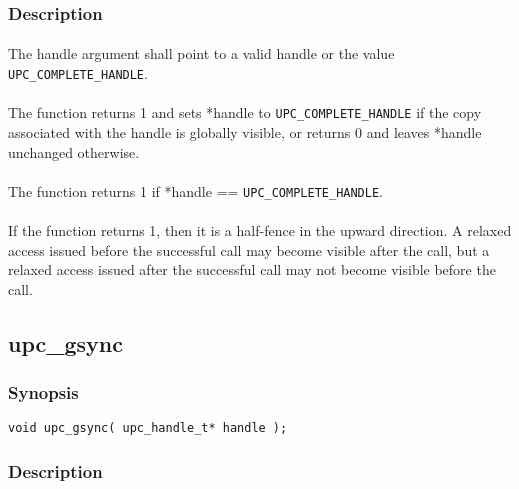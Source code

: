 \documentclass[10pt]{article}
\def \complete {{\tt UPC\_COMPLETE\_HANDLE}}
\begin{document}
\subsubsection{Description}

\paragraph{} The handle argument shall point to a valid handle or the value
\complete{}.

\paragraph{} The \function{} function returns 1 and sets *handle to \complete{}
if the copy associated with the handle is globally visible, or returns 0 and
leaves *handle unchanged otherwise.

\paragraph{} The \function{} function returns 1 if *handle == \complete{}.

\paragraph{} If the \function{} function returns 1, then it is a half-fence in the
upward direction.  A relaxed access issued before the successful \function{} call
may become visible after the call, but a relaxed access issued after the
successful \function{} call may not become visible before the call.

\subsection{upc\_gsync}
\def\function{{\tt upc\_gsync}}

\subsubsection{Synopsis}

\begin{verbatim}
void upc_gsync( upc_handle_t* handle );
\end{verbatim}

\subsubsection{Description}
\end{document}
